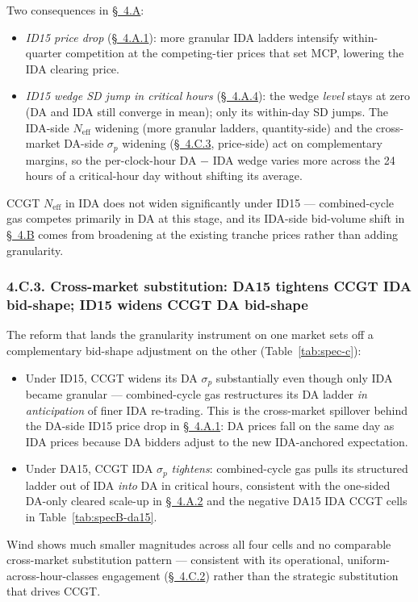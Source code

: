 \documentclass[11pt]{article}
\begin{document}
Two consequences in \hyperref[sec:4-specA]{\S~4.A}:
\begin{itemize}\setlength{\itemsep}{1pt}
\item \emph{ID15 price drop} (\hyperref[sec:4ii]{\S~4.A.1}): more granular IDA ladders intensify within-quarter competition at the competing-tier prices that set MCP, lowering the IDA clearing price.
\item \emph{ID15 wedge SD jump in critical hours} (\hyperref[sec:4-wedge]{\S~4.A.4}): the wedge \emph{level} stays at zero (DA and IDA still converge in mean); only its within-day SD jumps. The IDA-side $N_{\text{eff}}$ widening (more granular ladders, quantity-side) and the cross-market DA-side $\sigma_p$ widening (\hyperref[sec:4-c-cross]{\S~4.C.3}, price-side) act on complementary margins, so the per-clock-hour DA $-$ IDA wedge varies more across the 24 hours of a critical-hour day without shifting its average.
\end{itemize}
CCGT $N_{\text{eff}}$ in IDA does not widen significantly under ID15 --- combined-cycle gas competes primarily in DA at this stage, and its IDA-side bid-volume shift in \hyperref[sec:4-specB]{\S~4.B} comes from broadening at the existing tranche prices rather than adding granularity.

\subsubsection*{4.C.3. Cross-market substitution: DA15 tightens CCGT IDA bid-shape; ID15 widens CCGT DA bid-shape}\label{sec:4-c-cross}
The reform that lands the granularity instrument on one market sets off a complementary bid-shape adjustment on the other (Table~\ref{tab:spec-c}):
\begin{itemize}\setlength{\itemsep}{1pt}
\item Under ID15, CCGT widens its DA $\sigma_p$ substantially even though only IDA became granular --- combined-cycle gas restructures its DA ladder \emph{in anticipation} of finer IDA re-trading. This is the cross-market spillover behind the DA-side ID15 price drop in \hyperref[sec:4ii]{\S~4.A.1}: DA prices fall on the same day as IDA prices because DA bidders adjust to the new IDA-anchored expectation.
\item Under DA15, CCGT IDA $\sigma_p$ \emph{tightens}: combined-cycle gas pulls its structured ladder out of IDA \emph{into} DA in critical hours, consistent with the one-sided DA-only cleared scale-up in \hyperref[sec:4iii]{\S~4.A.2} and the negative DA15 IDA CCGT cells in Table~\ref{tab:specB-da15}.
\end{itemize}
Wind shows much smaller magnitudes across all four cells and no comparable cross-market substitution pattern --- consistent with its operational, uniform-across-hour-classes engagement (\hyperref[sec:4-c-id15-ida]{\S~4.C.2}) rather than the strategic substitution that drives CCGT.
\end{document}
